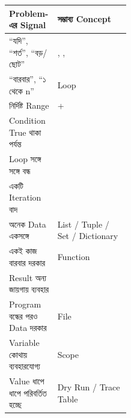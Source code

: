 \begin{tabularx}{\linewidth}{
|L{0.40\linewidth}
|Y|
}
\hline

\textbf{\color{darkTeal}Problem-এর Signal}
&
\textbf{\color{darkTeal}সম্ভাব্য Concept}
\\
\hline

“যদি”, “শর্ত”, “বড়/ছোট”
&
, , 
\\
\hline

“বারবার”, “১ থেকে n”
&
Loop
\\
\hline

নির্দিষ্ট Range
&
 + 
\\
\hline

Condition True থাকা পর্যন্ত
&
\\
\hline

Loop সঙ্গে সঙ্গে বন্ধ
&
\\
\hline

একটি Iteration বাদ
&
\\
\hline

অনেক Data একসঙ্গে
&
List / Tuple / Set / Dictionary
\\
\hline

একই কাজ বারবার দরকার
&
Function
\\
\hline

Result অন্য জায়গায় ব্যবহার
&
\\
\hline

Program বন্ধের পরও Data দরকার
&
File
\\
\hline

Variable কোথায় ব্যবহারযোগ্য
&
Scope
\\
\hline

Value ধাপে ধাপে পরিবর্তিত হচ্ছে
&
Dry Run / Trace Table
\\
\hline

\end{tabularx}


